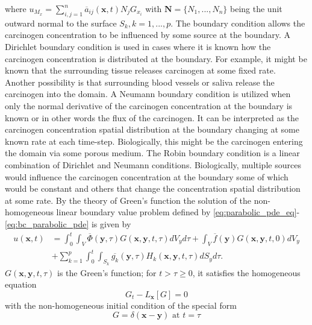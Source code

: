 \documentclass[\main/thesis.tex]{subfiles}
\begin{document}
where $u_{M_x} {=} \sum_{i, j {=} 1}^{n} \overline{a}_{ij}(\boldsymbol{x}, t) N_j G_{x_i}$ with $\boldsymbol{N} {=} \{ N_1, ..., N_n \}$ being the unit outward normal to the surface $S_k, k {=} 1, ..., p$.
The boundary condition allows the carcinogen concentration to be influenced by some source at the boundary. A Dirichlet boundary condition is used in cases where it is known how the carcinogen concentration is distributed at the boundary. For example, it might be known that the surrounding tissue releases carcinogen at some fixed rate. Another possibility is that surrounding blood vessels or saliva release the carcinogen into the domain. A Neumann boundary condition is utilized when only the normal derivative of the carcinogen concentration at the boundary is known or in other words the flux of the carcinogen. It can be interpreted as the carcinogen concentration spatial distribution at the boundary changing at some known rate at each time-step. Biologically, this might be the carcinogen entering the domain via some porous medium. The Robin boundary condition is a linear combination of Dirichlet and Neumann conditions. Biologically, multiple sources would influence the carcinogen concentration at the boundary some of which would be constant and others that change the concentration spatial distribution at some rate.
By the theory of Green's function the solution of the non-homogeneous linear boundary value problem defined by 
\eqref{eq:parabolic_pde_eq}-\eqref{eq:bc_parabolic_pde} is given by
\begin{align}
u(\boldsymbol{x}, t) &{=} \int_{0}^{t} \int_V \overline{\Phi}(\boldsymbol{y}, \tau) G(\boldsymbol{x}, \boldsymbol{y}, t, \tau) dV_y d\tau
                     {+} \int_{V} \overline{f}(\boldsymbol{y}) G(\boldsymbol{x}, \boldsymbol{y}, t, 0) dV_y 
                     \label{eq:Green_func_sol_parabolic_ibvp} \\
                     &{+} \sum_{k{=}1}^{p} \int_{0}^{t} \int_{S_k} \overline{g_k}(\boldsymbol{y}, \tau) H_k(\boldsymbol{x}, \boldsymbol{y}, t, \tau) dS_y d\tau \nonumber.
\end{align}
$G(\boldsymbol{x}, \boldsymbol{y}, t, \tau)$ is the Green's function; for $t {>} \tau {\ge} 0$, it satisfies the homogeneous equation
\begin{equation}
G_t {-} L_{\boldsymbol{x}}[G] {=} 0
\label{eq:Greens_func_pde}
\end{equation}
with the non-homogeneous initial condition of the special form
\begin{equation}
G {=} \delta(\boldsymbol{x} {-} \boldsymbol{y}) \text{ at } t {=} \tau
\label{eq:Greens_func_ic}
\end{equation}
\end{document}

